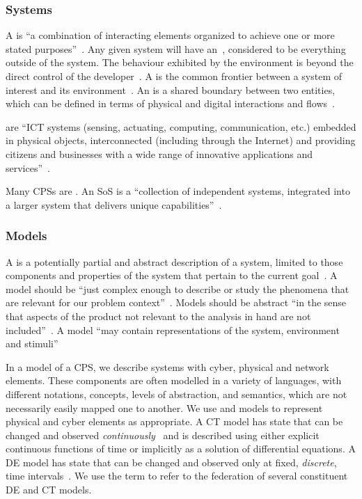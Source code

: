 \subsubsection{Systems}
\label{sec:concepts:systems}
A  is ``a combination of interacting elements organized to achieve one or more stated purposes''~\cite{INCOSEseh15}. Any given system will have an~, considered to be everything outside of the system. The behaviour exhibited by the environment is beyond the direct control of the developer~\cite{Broenink&12b}. A  is the common frontier between a system of interest and its environment~\cite{Broenink&12b}. An  is a shared boundary between two entities, which can be defined in terms of physical and digital interactions and flows~\cite{INCOSEseh15}.

 are ``ICT systems (sensing, actuating, computing, communication, etc.) embedded in physical objects, interconnected (including through the Internet) and providing citizens and businesses with a wide range of innovative applications and services''~\cite{Thompson13, Deka&15}. 

Many CPSs are . An SoS is a ``collection of independent systems, integrated into a larger system that delivers unique capabilities''~\cite{INCOSEsosprimer18}.


\subsubsection{Models}
\label{sec:concepts:models}

A  is a  potentially partial and abstract description of a system, limited to those components and properties of the system that pertain to the current goal~\cite{Holt&14}. A model should be ``just complex enough to describe or study the phenomena that are relevant for our problem context''~\cite{Amerongen10}. Models should be abstract ``in the sense that aspects of the product not relevant to the analysis in hand are not included''~\cite{Fitzgerald&98b}. A model ``may contain representations of the system, environment and stimuli''~\cite{Fitzgerald&14c}

In a model of a CPS, we describe systems with cyber, physical and network elements. These components are often modelled in a variety of languages, with different notations, concepts, levels of abstraction, and semantics, which are not necessarily easily mapped one to another. We use  and  models to represent physical and cyber elements as appropriate. A CT model has state that can be changed and observed \emph{continuously}~\cite{Amerongen10} and is described using either explicit continuous functions of time or implicitly as a solution of differential equations. A DE model has state that can be changed and observed only at fixed, \emph{discrete}, time intervals~\cite{Amerongen10}.  We use the term  to refer to the federation  of several constituent DE and CT models.


